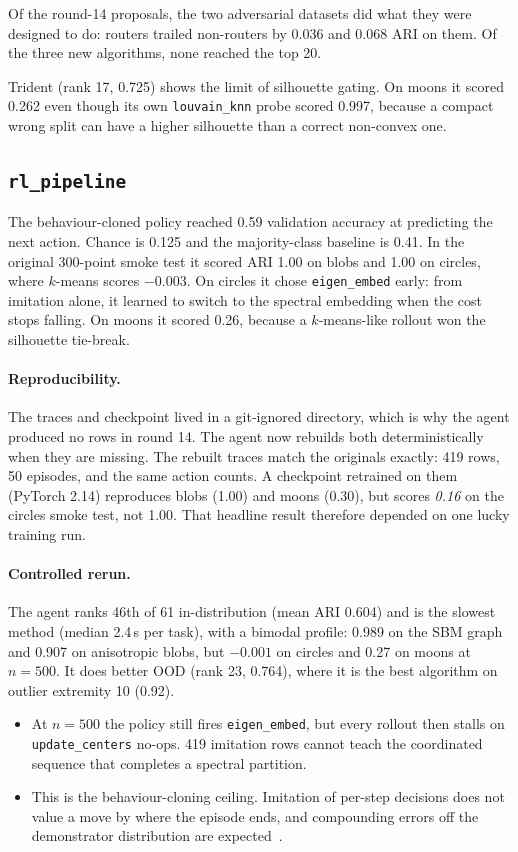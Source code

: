 \documentclass[11pt,a4paper]{article}
\newcommand{\code}[1]{\texttt{#1}}
\begin{document}
Of the round-14 proposals, the two adversarial datasets did what they were
designed to do: routers trailed non-routers by 0.036 and 0.068 ARI on them.
Of the three new algorithms, none reached the top 20.

Trident (rank 17, 0.725) shows the limit of silhouette gating. On moons it
scored 0.262 even though its own \code{louvain\_knn} probe scored 0.997,
because a compact wrong split can have a higher silhouette than a correct
non-convex one.

\subsection{\texorpdfstring{\code{rl\_pipeline}}{rl\_pipeline}}
The behaviour-cloned policy reached 0.59 validation accuracy at predicting the
next action. Chance is 0.125 and the majority-class baseline is 0.41. In the
original 300-point smoke test it scored ARI 1.00 on blobs and 1.00 on
circles, where $k$-means scores $-0.003$. On circles it chose
\code{eigen\_embed} early: from imitation alone, it learned to switch to the
spectral embedding when the cost stops falling. On moons it scored 0.26,
because a $k$-means-like rollout won the silhouette tie-break.

\paragraph{Reproducibility.} The traces and checkpoint lived in a git-ignored
directory, which is why the agent produced no rows in round 14. The agent now
rebuilds both deterministically when they are missing. The rebuilt traces
match the originals exactly: 419 rows, 50 episodes, and the same action
counts. A checkpoint retrained on them (PyTorch 2.14) reproduces blobs (1.00)
and moons (0.30), but scores \emph{0.16} on the circles smoke test, not 1.00.
That headline result therefore depended on one lucky training run.

\paragraph{Controlled rerun.} The agent ranks 46th of 61 in-distribution (mean
ARI 0.604) and is the slowest method (median 2.4\,s per task), with a bimodal
profile: 0.989 on the SBM graph and 0.907 on anisotropic blobs, but $-0.001$
on circles and 0.27 on moons at $n{=}500$. It does better OOD (rank 23,
0.764), where it is the best algorithm on outlier extremity 10 (0.92).
\begin{itemize}
  \item At $n{=}500$ the policy still fires \code{eigen\_embed}, but every
  rollout then stalls on \code{update\_centers} no-ops. 419 imitation rows
  cannot teach the coordinated sequence that completes a spectral partition.
  \item This is the behaviour-cloning ceiling. Imitation of per-step
  decisions does not value a move by where the episode ends, and compounding
  errors off the demonstrator distribution are
  expected~\cite{ross2011reduction}.
\end{itemize}
\end{document}
